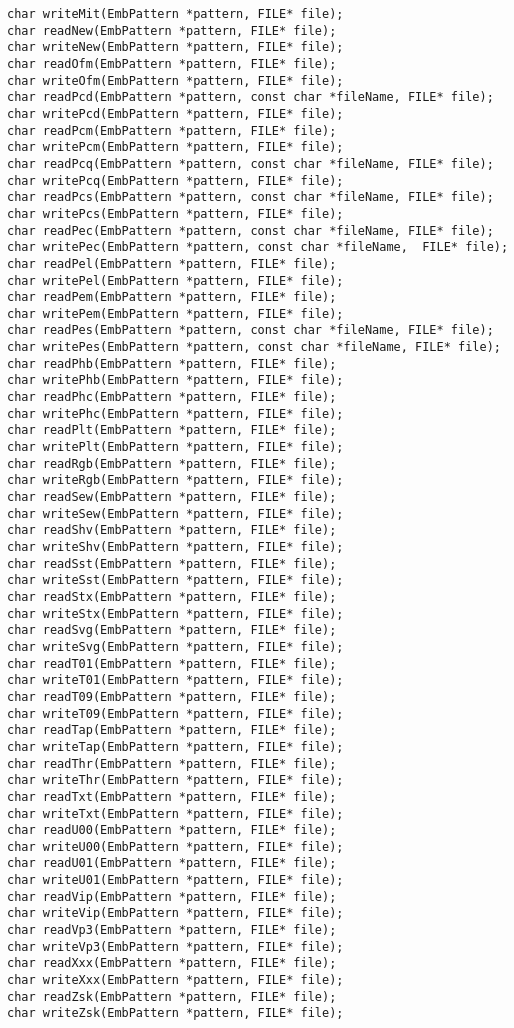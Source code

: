 \begin{lstlisting}
char writeMit(EmbPattern *pattern, FILE* file);
char readNew(EmbPattern *pattern, FILE* file);
char writeNew(EmbPattern *pattern, FILE* file);
char readOfm(EmbPattern *pattern, FILE* file);
char writeOfm(EmbPattern *pattern, FILE* file);
char readPcd(EmbPattern *pattern, const char *fileName, FILE* file);
char writePcd(EmbPattern *pattern, FILE* file);
char readPcm(EmbPattern *pattern, FILE* file);
char writePcm(EmbPattern *pattern, FILE* file);
char readPcq(EmbPattern *pattern, const char *fileName, FILE* file);
char writePcq(EmbPattern *pattern, FILE* file);
char readPcs(EmbPattern *pattern, const char *fileName, FILE* file);
char writePcs(EmbPattern *pattern, FILE* file);
char readPec(EmbPattern *pattern, const char *fileName, FILE* file);
char writePec(EmbPattern *pattern, const char *fileName,  FILE* file);
char readPel(EmbPattern *pattern, FILE* file);
char writePel(EmbPattern *pattern, FILE* file);
char readPem(EmbPattern *pattern, FILE* file);
char writePem(EmbPattern *pattern, FILE* file);
char readPes(EmbPattern *pattern, const char *fileName, FILE* file);
char writePes(EmbPattern *pattern, const char *fileName, FILE* file);
char readPhb(EmbPattern *pattern, FILE* file);
char writePhb(EmbPattern *pattern, FILE* file);
char readPhc(EmbPattern *pattern, FILE* file);
char writePhc(EmbPattern *pattern, FILE* file);
char readPlt(EmbPattern *pattern, FILE* file);
char writePlt(EmbPattern *pattern, FILE* file);
char readRgb(EmbPattern *pattern, FILE* file);
char writeRgb(EmbPattern *pattern, FILE* file);
char readSew(EmbPattern *pattern, FILE* file);
char writeSew(EmbPattern *pattern, FILE* file);
char readShv(EmbPattern *pattern, FILE* file);
char writeShv(EmbPattern *pattern, FILE* file);
char readSst(EmbPattern *pattern, FILE* file);
char writeSst(EmbPattern *pattern, FILE* file);
char readStx(EmbPattern *pattern, FILE* file);
char writeStx(EmbPattern *pattern, FILE* file);
char readSvg(EmbPattern *pattern, FILE* file);
char writeSvg(EmbPattern *pattern, FILE* file);
char readT01(EmbPattern *pattern, FILE* file);
char writeT01(EmbPattern *pattern, FILE* file);
char readT09(EmbPattern *pattern, FILE* file);
char writeT09(EmbPattern *pattern, FILE* file);
char readTap(EmbPattern *pattern, FILE* file);
char writeTap(EmbPattern *pattern, FILE* file);
char readThr(EmbPattern *pattern, FILE* file);
char writeThr(EmbPattern *pattern, FILE* file);
char readTxt(EmbPattern *pattern, FILE* file);
char writeTxt(EmbPattern *pattern, FILE* file);
char readU00(EmbPattern *pattern, FILE* file);
char writeU00(EmbPattern *pattern, FILE* file);
char readU01(EmbPattern *pattern, FILE* file);
char writeU01(EmbPattern *pattern, FILE* file);
char readVip(EmbPattern *pattern, FILE* file);
char writeVip(EmbPattern *pattern, FILE* file);
char readVp3(EmbPattern *pattern, FILE* file);
char writeVp3(EmbPattern *pattern, FILE* file);
char readXxx(EmbPattern *pattern, FILE* file);
char writeXxx(EmbPattern *pattern, FILE* file);
char readZsk(EmbPattern *pattern, FILE* file);
char writeZsk(EmbPattern *pattern, FILE* file);


\end{lstlisting}
